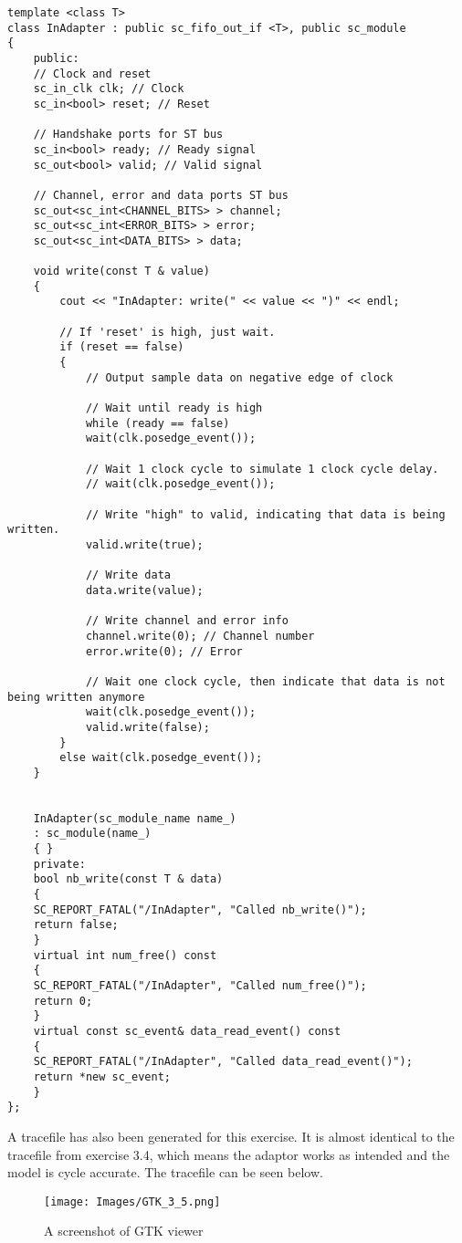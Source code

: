 \begin{lstlisting}
template <class T>
class InAdapter : public sc_fifo_out_if <T>, public sc_module
{
	public:
	// Clock and reset
	sc_in_clk clk; // Clock
	sc_in<bool> reset; // Reset
	
	// Handshake ports for ST bus
	sc_in<bool> ready; // Ready signal
	sc_out<bool> valid; // Valid signal
	
	// Channel, error and data ports ST bus
	sc_out<sc_int<CHANNEL_BITS> > channel;
	sc_out<sc_int<ERROR_BITS> > error;
	sc_out<sc_int<DATA_BITS> > data;
	
	void write(const T & value)
	{
		cout << "InAdapter: write(" << value << ")" << endl;
		
		// If 'reset' is high, just wait.
		if (reset == false)
		{
			// Output sample data on negative edge of clock
			
			// Wait until ready is high
			while (ready == false)
			wait(clk.posedge_event());
			
			// Wait 1 clock cycle to simulate 1 clock cycle delay.
			// wait(clk.posedge_event());
			
			// Write "high" to valid, indicating that data is being written.
			valid.write(true);
			
			// Write data
			data.write(value);
			
			// Write channel and error info
			channel.write(0); // Channel number
			error.write(0); // Error
			
			// Wait one clock cycle, then indicate that data is not being written anymore
			wait(clk.posedge_event());
			valid.write(false);
		}
		else wait(clk.posedge_event());
	}
	
	
	InAdapter(sc_module_name name_)
	: sc_module(name_)
	{ }
	private:
	bool nb_write(const T & data)
	{
	SC_REPORT_FATAL("/InAdapter", "Called nb_write()");
	return false;
	}
	virtual int num_free() const
	{
	SC_REPORT_FATAL("/InAdapter", "Called num_free()");
	return 0;
	}
	virtual const sc_event& data_read_event() const
	{
	SC_REPORT_FATAL("/InAdapter", "Called data_read_event()");
	return *new sc_event;
	}
};
\end{lstlisting}

A tracefile has also been generated for this exercise. It is almost identical to the tracefile from exercise 3.4, which means the adaptor works as intended and the model is cycle accurate. The tracefile can be seen below.

\begin{figure}[H]
	\centering
	\texttt{[image: Images/GTK\_3\_5.png]}
	\caption{A screenshot of GTK viewer}
	\label{fig:GTK_Viewer2}
\end{figure}
